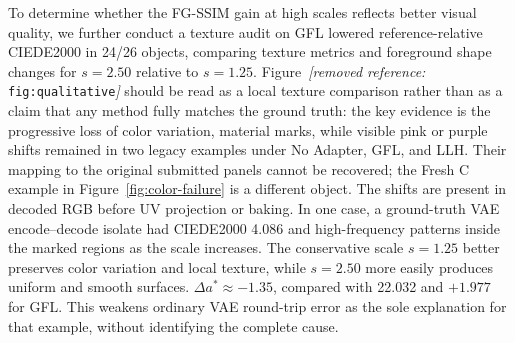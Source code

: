 \documentclass[times,twocolumn,final]{elsarticle}
\providecommand{\DIFadd}[1]{{\protect\color{blue} \sf #1}} %
\providecommand{\DIFdel}[1]{{\protect\color{red} \scriptsize #1}} %
\providecommand{\DIFaddbegin}{} %
\providecommand{\DIFaddend}{} %
\providecommand{\DIFdelbegin}{} %
\providecommand{\DIFdelend}{} %
\begin{document}
\DIFdelbegin \DIFdel{To determine whether the FG-SSIM gain at high scales reflects better visual quality, we further conduct a texture audit on }\DIFdelend \DIFaddbegin \DIFadd{GFL lowered reference-relative CIEDE2000 in 24/}\DIFaddend 26 objects, \DIFdelbegin \DIFdel{comparing texture metrics and foreground shape changes for $s = 2.50$ relative to $s = 1.25$. Figure~\textit{[removed reference: }\texttt{fig:qualitative}\textit{]} should be read as a local texture comparison rather than as a claim that any method fully matches the ground truth: the key evidence is the progressive loss of color variation, material marks, }\DIFdelend \DIFaddbegin \DIFadd{while visible pink or purple shifts remained in two legacy examples under No Adapter, GFL, and LLH. Their mapping to the original submitted panels cannot be recovered; the Fresh C example in Figure~\ref{fig:color-failure} is a different object. The shifts are present in decoded RGB before UV projection or baking. In one case, a ground-truth VAE encode--decode isolate had CIEDE2000 4.086 }\DIFaddend and \DIFdelbegin \DIFdel{high-frequency patterns inside the marked regions as the scale increases.
The conservative scale $s = 1.25$ better preserves color variation and local texture, while $s = 2.50$ more easily produces uniform and smooth surfaces. }\DIFdelend \DIFaddbegin \DIFadd{$\Delta a^*\approx-1.35$, compared with 22.032 and $+1.977$ for GFL. This weakens ordinary VAE round-trip error as the sole explanation for that example, without identifying the complete cause.
}\DIFaddend

\DIFdelbegin %
\end{document}
